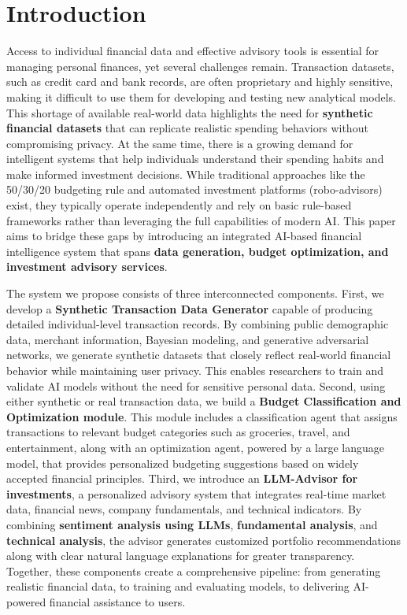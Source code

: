\documentclass[conference]{IEEEtran}
\begin{document}
\section{Introduction}
Access to individual financial data and effective advisory tools is essential for managing personal finances, yet several challenges remain. Transaction datasets, such as credit card and bank records, are often proprietary and highly sensitive, making it difficult to use them for developing and testing new analytical models. This shortage of available real-world data highlights the need for \textbf{synthetic financial datasets} that can replicate realistic spending behaviors without compromising privacy. At the same time, there is a growing demand for intelligent systems that help individuals understand their spending habits and make informed investment decisions. While traditional approaches like the 50/30/20 budgeting rule \cite{b8} and automated investment platforms (robo-advisors) exist, they typically operate independently and rely on basic rule-based frameworks rather than leveraging the full capabilities of modern AI. This paper aims to bridge these gaps by introducing an integrated AI-based financial intelligence system that spans \textbf{data generation, budget optimization, and investment advisory services}.

The system we propose consists of three interconnected components. First, we develop a \textbf{Synthetic Transaction Data Generator} capable of producing detailed individual-level transaction records. By combining public demographic data, merchant information, Bayesian modeling, and generative adversarial networks, we generate synthetic datasets that closely reflect real-world financial behavior while maintaining user privacy. This enables researchers to train and validate AI models without the need for sensitive personal data. Second, using either synthetic or real transaction data, we build a \textbf{Budget Classification and Optimization module}. This module includes a classification agent that assigns transactions to relevant budget categories such as groceries, travel, and entertainment, along with an optimization agent, powered by a large language model, that provides personalized budgeting suggestions based on widely accepted financial principles.
Third, we introduce an \textbf{LLM-Advisor for investments}, a personalized advisory system that integrates real-time market data, financial news, company fundamentals, and technical indicators. By combining \textbf{sentiment analysis using LLMs}, \textbf{fundamental analysis}, and \textbf{technical analysis}, the advisor generates customized portfolio recommendations along with clear natural language explanations for greater transparency. Together, these components create a comprehensive pipeline: from generating realistic financial data, to training and evaluating models, to delivering AI-powered financial assistance to users.
\end{document}
